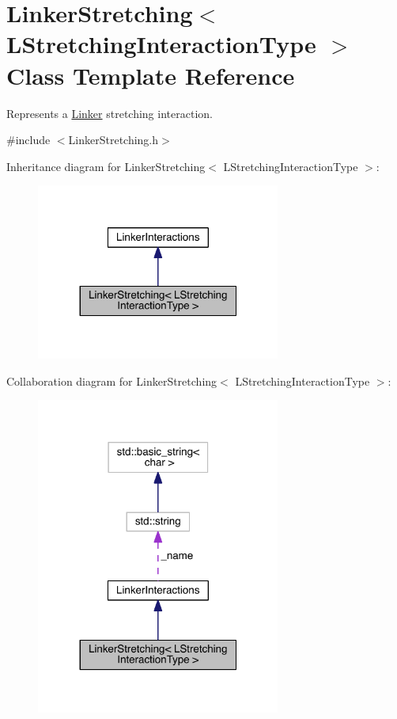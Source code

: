 \hypertarget{classLinkerStretching}{\section{Linker\+Stretching$<$ L\+Stretching\+Interaction\+Type $>$ Class Template Reference}
\label{classLinkerStretching}
}


Represents a \hyperlink{classLinker}{Linker} stretching interaction.  




{\ttfamily \#include $<$Linker\+Stretching.\+h$>$}



Inheritance diagram for Linker\+Stretching$<$ L\+Stretching\+Interaction\+Type $>$\+:\nopagebreak
\begin{figure}[H]
\begin{center}
\leavevmode
\includegraphics[width=227pt]{classLinkerStretching__inherit__graph}
\end{center}
\end{figure}


Collaboration diagram for Linker\+Stretching$<$ L\+Stretching\+Interaction\+Type $>$\+:\nopagebreak
\begin{figure}[H]
\begin{center}
\leavevmode
\includegraphics[width=227pt]{classLinkerStretching__coll__graph}
\end{center}
\end{figure}

